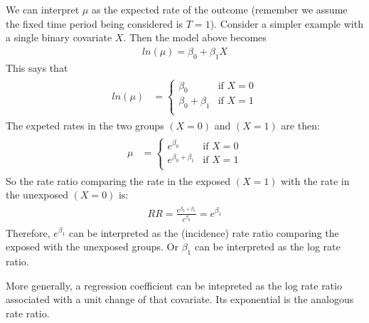 \documentclass[letterpaper,10pt,english]{jupyterBook}
\begin{document}
\sphinxAtStartPar
We can interpret \(\mu\) as the expected rate of the outcome (remember we assume the fixed time period being considered is \(T=1\)). Consider a simpler example with a single binary covariate \(X\). Then the model above becomes
\begin{equation*}
\begin{split}
ln(\mu) = \beta_0 + \beta_1 X
\end{split}
\end{equation*}
\sphinxAtStartPar
This says that
\begin{equation*}
\begin{split}
\begin{align*}
ln(\mu) &=
\begin{cases} 
\beta_0 &\mbox{if } X=0 \\
\beta_0 + \beta_1  &\mbox{if } X=1 \\
\end{cases}
\end{align*}
\end{split}
\end{equation*}
\sphinxAtStartPar
The expeted rates in the two groups \((X=0)\) and \((X=1)\) are then:
\begin{equation*}
\begin{split}
\begin{align*}
\mu &=
\begin{cases} 
e^{\beta_0} &\mbox{if } X=0 \\
e^{\beta_0 + \beta_1}  &\mbox{if } X=1 \\
\end{cases}
\end{align*}
\end{split}
\end{equation*}
\sphinxAtStartPar
So the rate ratio comparing the rate in the exposed \((X=1)\) with the rate in the unexposed \((X=0)\) is:
\begin{equation*}
\begin{split}
\begin{align*}
RR = \frac{e^{\beta_0 + \beta_1}}{e^{\beta_0}} = e^{\beta_1}
\end{align*}
\end{split}
\end{equation*}
\sphinxAtStartPar
Therefore, \(e^{\beta_1}\) can be interpreted as the (incidence) rate ratio comparing the exposed with the unexposed groups. Or \(\beta_1\) can be interpreted as the log rate ratio.

\sphinxAtStartPar
More generally, a regression coefficient can be intepreted as the log rate ratio associated with a unit change of that covariate. Its exponential is the analogous rate ratio.
\end{document}
